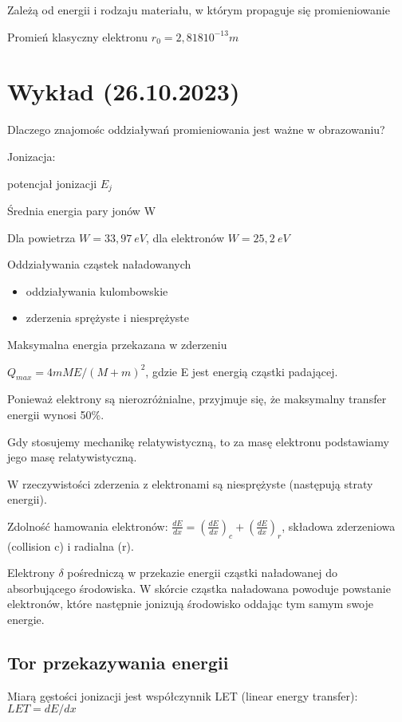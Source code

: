 \documentclass{article}
\begin{document}
Zależą od energii i rodzaju materiału, w którym propaguje się promieniowanie

Promień klasyczny elektronu $r_0 = 2,818 10^{-13} m$

\section{Wykład (26.10.2023)}

Dlaczego znajomośc oddziaływań promieniowania jest ważne w obrazowaniu?

Jonizacja:

potencjał jonizacji $E_j$

Średnia energia pary jonów W

Dla powietrza $W = 33,97~eV$, dla elektronów $W = 25,2~eV$

Oddziaływania cząstek naładowanych
\begin{itemize}
    \item oddziaływania kulombowskie
    \item zderzenia sprężyste i niesprężyste
\end{itemize}

Maksymalna energia przekazana w zderzeniu

$Q_{max} = 4mME/(M+m)^2$, gdzie E jest energią cząstki padającej.

Ponieważ elektrony są nierozróżnialne, przyjmuje się, że maksymalny transfer energii wynosi 50\%.

Gdy stosujemy mechanikę relatywistyczną, to za masę elektronu podstawiamy jego masę relatywistyczną.

W rzeczywistości zderzenia z elektronami są niesprężyste (następują straty energii).

Zdolność hamowania elektronów: $\frac{dE}{dx} = (\frac{dE}{dx})_c + (\frac{dE}{dx})_r$, składowa zderzeniowa (collision c) i radialna (r).

Elektrony $\delta$ pośredniczą w przekazie energii cząstki naładowanej do absorbującego środowiska. W skórcie cząstka naładowana powoduje powstanie elektronów, które następnie jonizują środowisko oddając tym samym swoje energie.

\subsection{Tor przekazywania energii}

Miarą gęstości jonizacji jest współczynnik LET (linear energy transfer): $LET = dE/dx$
\end{document}
